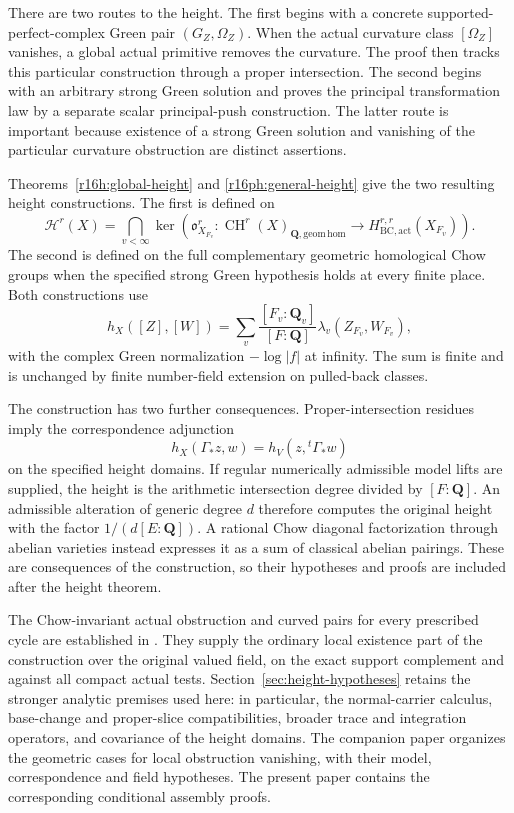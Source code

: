 \documentclass[11pt,a4paper]{article}
\theoremstyle{definition}
\theoremstyle{remark}
\numberwithin{equation}{section}
\newcommand{\CH}{\operatorname{CH}}
\begin{document}
There are two routes to the height. The first begins with a concrete supported-perfect-complex Green pair $(G_Z,\Omega_Z)$. When the actual curvature class $[\Omega_Z]$ vanishes, a global actual primitive removes the curvature. The proof then tracks this particular construction through a proper intersection. The second begins with an arbitrary strong Green solution and proves the principal transformation law by a separate scalar principal-push construction. The latter route is important because existence of a strong Green solution and vanishing of the particular curvature obstruction are distinct assertions.

Theorems~\ref{r16h:global-height} and \ref{r16ph:general-height} give the two resulting height constructions. The first is defined on
\[
 \mathcal H^r(X)=\bigcap_{v<\infty}
 \ker\!\left(\mathfrak o_{X_{F_v}}^r:
 \CH^r(X)_{\mathbf Q,\mathrm{geom\,hom}}
 \longrightarrow H_{\mathrm{BC,act}}^{r,r}(X_{F_v})\right).
\]
The second is defined on the full complementary geometric homological Chow groups when the specified strong Green hypothesis holds at every finite place. Both constructions use
\[
 h_X([Z],[W])=\sum_v\frac{[F_v:\mathbf Q_v]}{[F:\mathbf Q]}
                    \lambda_v(Z_{F_v},W_{F_v}),
\]
with the complex Green normalization $-\log|f|$ at infinity. The sum is finite and is unchanged by finite number-field extension on pulled-back classes.

The construction has two further consequences. Proper-intersection residues imply the correspondence adjunction
\[
 h_X(\Gamma_*z,w)=h_V(z,{}^t\Gamma_*w)
\]
on the specified height domains. If regular numerically admissible model lifts are supplied, the height is the arithmetic intersection degree divided by $[F:\mathbf Q]$. An admissible alteration of generic degree $d$ therefore computes the original height with the factor $1/(d[E:\mathbf Q])$. A rational Chow diagonal factorization through abelian varieties instead expresses it as a sum of classical abelian pairings. These are consequences of the construction, so their hypotheses and proofs are included after the height theorem.

The Chow-invariant actual obstruction and curved pairs for every prescribed cycle are established in \cite[Theorem 1.1]{ChowGreenPairs}. They supply the ordinary local existence part of the construction over the original valued field, on the exact support complement and against all compact actual tests. Section~\ref{sec:height-hypotheses} retains the stronger analytic premises used here: in particular, the normal-carrier calculus, base-change and proper-slice compatibilities, broader trace and integration operators, and covariance of the height domains. The companion paper \cite{SC} organizes the geometric cases for local obstruction vanishing, with their model, correspondence and field hypotheses. The present paper contains the corresponding conditional assembly proofs.
\end{document}
